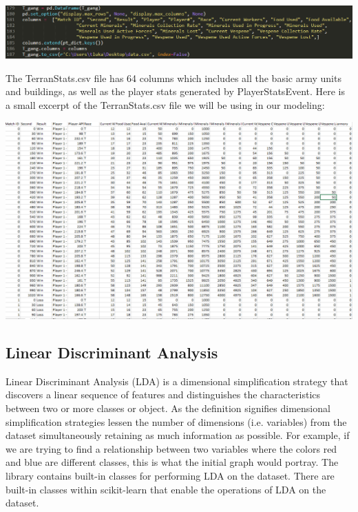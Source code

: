 \documentclass[a4paper,12pt]{report}
\begin{document}
\begin{center}
    \captionsetup{type=figure}
    \includegraphics[width=.9\linewidth]{media/DataframeCSV.png}
\end{center}

The TerranStats.csv file has 64 columns which includes all the basic army units and buildings, as well as the player stats generated by PlayerStatsEvent. Here is a small excerpt of the TerranStats.csv file we will be using in our modeling:

\begin{center}
    \captionsetup{type=figure}
    \includegraphics[width=.9\linewidth]{media/TerranstatsCSV2.png}
\end{center}

\subsection{Linear Discriminant Analysis}
 
Linear Discriminant Analysis (LDA) is a dimensional simplification strategy that discovers a linear sequence of features and distinguishes the characteristics between two or more classes or object. As the definition signifies dimensional simplification strategies lessen the number of dimensions (i.e. variables) from the dataset simultaneously retaining as much information as possible. For example, if we are trying to find a relationship between two variables where the colors red and blue are different classes, this is what the initial graph would portray. The library contains built-in classes for performing LDA on the dataset. There are built-in classes within scikit-learn that enable the operations of LDA on the dataset.
\end{document}
